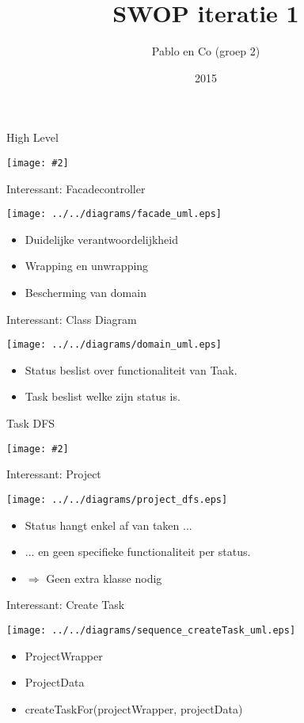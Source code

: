 \documentclass[mathserif,serif]{beamer}
\title{SWOP iteratie 1}
\author{Pablo en Co (groep 2)}
\institute{KU Leuven}
\date{2015}
\newcommand {\framedgraphic}[2] {
    \begin{frame}{#1}
        \begin{center}
            \texttt{[image: \#2]}
        \end{center}
    \end{frame}
}
\begin{document}
 
  \frame{\titlepage}
  \framedgraphic{High Level}{../../diagrams/high_level_uml.eps}
  \begin{frame}{Interessant: Facadecontroller}
      \begin{center}
      \texttt{[image: ../../diagrams/facade\_uml.eps]}
        \begin{itemize}
        \item Duidelijke verantwoordelijkheid
        \item Wrapping en unwrapping
        \item Bescherming van domain
        \end{itemize}
      \end{center}
  \end{frame} 
  \begin{frame}{Interessant: Class Diagram}
      \begin{center}
      \texttt{[image: ../../diagrams/domain\_uml.eps]}
        \begin{itemize}
        \item Status beslist over functionaliteit van Taak.
        \item Task beslist welke zijn status is.
        \end{itemize}
      \end{center}
  \end{frame} 
  \framedgraphic{Task DFS}{../../diagrams/task_dfs.eps}
  \begin{frame}{Interessant: Project}
      \begin{center}
      \texttt{[image: ../../diagrams/project\_dfs.eps]}
        \begin{itemize}
        \item Status hangt enkel af van taken ...
        \item ... en geen specifieke functionaliteit per status.
        \item $\Rightarrow$ Geen extra klasse nodig
        \end{itemize}
      \end{center}
  \end{frame} 
  \begin{frame}{Interessant: Create Task}
      \begin{center}
        \texttt{[image: ../../diagrams/sequence\_createTask\_uml.eps]}
        \begin{itemize}
        \item ProjectWrapper
        \item ProjectData   
        \item createTaskFor(projectWrapper, projectData)
        \end{itemize}
      \end{center}
  \end{frame}
\end{document}
